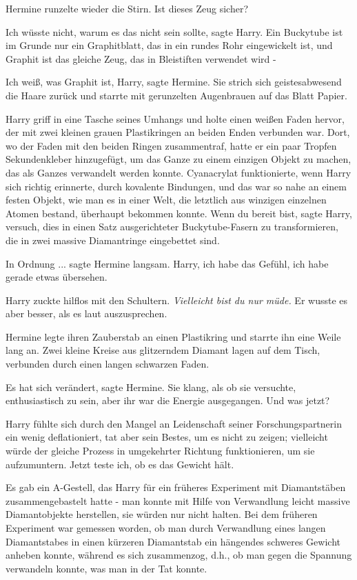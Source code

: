Hermine runzelte wieder die Stirn. \glqq{}Ist dieses Zeug sicher?\grqq{}

\glqq{}Ich wüsste nicht, warum es das nicht sein sollte\grqq{}, sagte Harry.
\glqq{}Ein Buckytube ist im Grunde nur ein Graphitblatt, das in ein rundes Rohr
eingewickelt ist, und Graphit ist das gleiche Zeug, das in Bleistiften verwendet
wird -\grqq{}

\glqq{}Ich weiß, was Graphit ist, Harry\grqq{}, sagte Hermine. Sie strich sich
geistesabwesend die Haare zurück und starrte mit gerunzelten Augenbrauen auf das
Blatt Papier.

Harry griff in eine Tasche seines Umhangs und holte einen weißen Faden hervor,
der mit zwei kleinen grauen Plastikringen an beiden Enden verbunden war. Dort,
wo der Faden mit den beiden Ringen zusammentraf, hatte er ein paar Tropfen
Sekundenkleber hinzugefügt, um das Ganze zu einem einzigen Objekt zu machen, das
als Ganzes verwandelt werden konnte. Cyanacrylat funktionierte, wenn Harry sich
richtig erinnerte, durch kovalente Bindungen, und das war so nahe an einem
\glqq{}festen Objekt\grqq{}, wie man es in einer Welt, die letztlich aus
winzigen einzelnen Atomen bestand, überhaupt bekommen konnte. \glqq{}Wenn du
bereit bist\grqq{}, sagte Harry, \glqq{}versuch, dies in einen Satz
ausgerichteter Buckytube-Fasern zu transformieren, die in zwei massive
Diamantringe eingebettet sind.\grqq{}

\glqq{}In Ordnung ...\grqq{} sagte Hermine langsam. \glqq{}Harry, ich habe das
Gefühl, ich habe gerade etwas übersehen.\grqq{}

Harry zuckte hilflos mit den Schultern. \emph{Vielleicht bist du nur müde.} Er
wusste es aber besser, als es laut auszusprechen.

Hermine legte ihren Zauberstab an einen Plastikring und starrte ihn eine Weile
lang an. Zwei kleine Kreise aus glitzerndem Diamant lagen auf dem Tisch,
verbunden durch einen langen schwarzen Faden.

\glqq{}Es hat sich verändert\grqq{}, sagte Hermine. Sie klang, als ob sie
versuchte, enthusiastisch zu sein, aber ihr war die Energie ausgegangen. \glqq{}
Und was jetzt?\grqq{}

Harry fühlte sich durch den Mangel an Leidenschaft seiner Forschungspartnerin
ein wenig deflationiert, tat aber sein Bestes, um es nicht zu zeigen; vielleicht
würde der gleiche Prozess in umgekehrter Richtung funktionieren, um sie
aufzumuntern. \glqq{}Jetzt teste ich, ob es das Gewicht hält.\grqq{}

Es gab ein A-Gestell, das Harry für ein früheres Experiment mit Diamantstäben
zusammengebastelt hatte - man konnte mit Hilfe von Verwandlung leicht massive
Diamantobjekte herstellen, sie würden nur nicht halten. Bei dem früheren
Experiment war gemessen worden, ob man durch Verwandlung eines langen
Diamantstabes in einen kürzeren Diamantstab ein hängendes schweres Gewicht
anheben konnte, während es sich zusammenzog, d.h., ob man gegen die Spannung
verwandeln konnte, was man in der Tat konnte.


